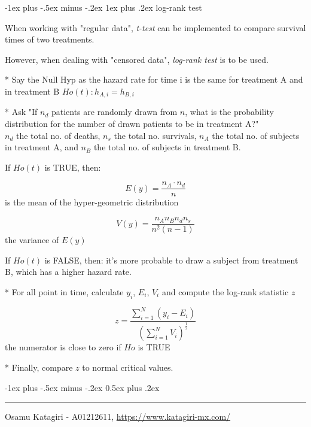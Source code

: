 \documentclass[10pt,landscape]{article}
\makeatletter
\renewcommand{\section}{\@startsection{section}{1}{0mm}%
                                {-1ex plus -.5ex minus -.2ex}%
                                {0.5ex plus .2ex}%
                                {\normalfont\large\bfseries}}
\renewcommand{\subsubsection}{\@startsection{subsubsection}{3}{0mm}%
                                {-1ex plus -.5ex minus -.2ex}%
                                {1ex plus .2ex}%
                                {\normalfont\small\bfseries}}
\makeatother
\begin{document}
\begin{multicols}{3}
\subsubsection{log-rank test}

When working with "regular data", \emph{t-test} can be implemented to compare survival times of two treatments.

\medskip
However, when dealing with "censored data", \emph{log-rank test} is to be used.

* Say the Null Hyp as the hazard rate for time i is the same for treatment A and in treatment B $Ho(t) : h_{A,i} = h_{B,i}$

* Ask "If $n_d$ patients are randomly drawn from $n$, what is the probability distribution for the number of drawn patients to be in treatment A?" \\
$n_d$ the total no. of deaths, $n_s$ the total no. survivals, $n_A$ the total no. of subjects in treatment A, and $n_B$ the total no. of subjects in treatment B.

\medskip
If $Ho(t)$ is TRUE, then:

$$ E(y) = \frac{n_A \cdot n_d}{n} $$ is the mean of the hyper-geometric distribution

$$ V(y) = \frac{n_A n_B n_d n_s}{n^2 (n - 1)} $$ the variance of $E(y)$

\medskip
If $Ho(t)$ is FALSE, then: it's more probable to draw a subject from treatment B, which has a higher hazard rate.

* For all point in time, calculate $y_i$, $E_i$, $V_i$ and compute the log-rank statistic $z$

$$ z = \frac{\sum_{i = 1}^{N} (y_i - E_i)}{\left(\sum_{i = 1}^{N} V_i\right)^{\frac{1}{2}}} $$ the numerator is close to zero if $Ho$ is TRUE

* Finally, compare $z$ to normal critical values.

\section{} %
\hrule
Osamu Katagiri - A01212611, \href{https://www.katagiri-mx.com/}{https://www.katagiri-mx.com/}
\end{multicols}
\end{document}
